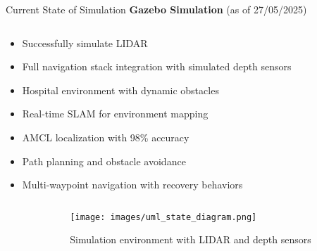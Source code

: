 \documentclass[aspectratio=169]{beamer}
\newcommand{\reducefontsize}{\fontsize{7}{9}\selectfont}
\begin{document}
\begin{frame}{Current State of Simulation}
\textbf{Gazebo Simulation} (as of 27/05/2025)
{\reducefontsize%
\begin{columns}
	\begin{column}{0.45\textwidth}
		\begin{itemize}
			\item Successfully simulate LIDAR
			\item Full navigation stack integration with simulated depth sensors
			\item Hospital environment with dynamic obstacles
			\item Real-time SLAM for environment mapping
			\item AMCL localization with 98\% accuracy
			\item Path planning and obstacle avoidance
			\item Multi-waypoint navigation with recovery behaviors
		\end{itemize}
	\end{column}
	\begin{column}{0.45\textwidth}
		\centering
	\end{column}
\end{columns}

\begin{columns}
\begin{column}{0.45\textwidth}
	\centering
\end{column}
\begin{column}{0.45\textwidth}
  \begin{figure}
    \texttt{[image: images/uml\_state\_diagram.png]}
    \caption{Simulation environment with LIDAR and depth sensors}
  \end{figure}
\end{column}
\end{columns}
}
\end{frame}
\end{document}
